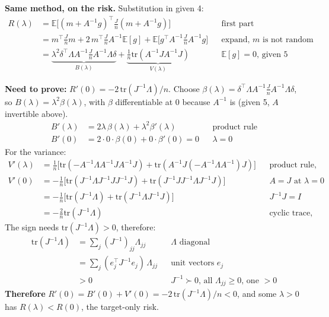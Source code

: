 \documentclass{article}
\begin{document}
\textbf{Same method, on the risk.} Substitution in given 4:
\begin{align*}
R(\lambda) &= \mathbb{E}\bigl[(m + A^{-1}g)^\top \tfrac{J}{n} (m + A^{-1}g)\bigr] && \text{first part}\\
&= m^\top \tfrac{J}{n} m + 2\, m^\top \tfrac{J}{n} A^{-1}\mathbb{E}[g] + \mathbb{E}\bigl[g^\top A^{-1}\tfrac{J}{n}A^{-1} g\bigr] && \text{expand, $m$ is not random}\\
&= \underbrace{\lambda^2 \delta^\top\Lambda A^{-1}\tfrac{J}{n}A^{-1}\Lambda\delta}_{B(\lambda)} + \underbrace{\tfrac{1}{n}\mathrm{tr}(A^{-1}JA^{-1}J)}_{V(\lambda)} && \text{$\mathbb{E}[g] = 0$, given 5}
\end{align*}

\textbf{Need to prove:} $R'(0) = -2\,\mathrm{tr}(J^{-1}\Lambda)/n$.
Choose $\beta(\lambda) = \delta^\top\Lambda A^{-1}\tfrac{J}{n}A^{-1}\Lambda\delta$, so $B(\lambda) = \lambda^2\beta(\lambda)$, with $\beta$ differentiable at $0$ because $A^{-1}$ is (given 5, $A$ invertible above).
\begin{align*}
B'(\lambda) &= 2\lambda\,\beta(\lambda) + \lambda^2\beta'(\lambda) && \text{product rule}\\
B'(0) &= 2\cdot 0\cdot\beta(0) + 0\cdot\beta'(0) = 0 && \text{$\lambda = 0$}
\end{align*}
For the variance:
\begin{align*}
V'(\lambda) &= \tfrac{1}{n}\bigl[\mathrm{tr}(-A^{-1}\Lambda A^{-1} J A^{-1} J) + \mathrm{tr}(A^{-1} J (-A^{-1}\Lambda A^{-1}) J)\bigr] && \text{product rule, given 5}\\
V'(0) &= -\tfrac{1}{n}\bigl[\mathrm{tr}(J^{-1}\Lambda J^{-1}J J^{-1}J) + \mathrm{tr}(J^{-1}J J^{-1}\Lambda J^{-1}J)\bigr] && \text{$A = J$ at $\lambda = 0$}\\
&= -\tfrac{1}{n}\bigl[\mathrm{tr}(J^{-1}\Lambda) + \mathrm{tr}(J^{-1}\Lambda J^{-1}J)\bigr] && \text{$J^{-1}J = I$}\\
&= -\tfrac{2}{n}\mathrm{tr}(J^{-1}\Lambda) && \text{cyclic trace, given 5}
\end{align*}
The sign needs $\mathrm{tr}(J^{-1}\Lambda) > 0$, therefore:
\begin{align*}
\mathrm{tr}(J^{-1}\Lambda) &= \textstyle\sum_j (J^{-1})_{jj}\Lambda_{jj} && \text{$\Lambda$ diagonal}\\
&= \textstyle\sum_j (e_j^\top J^{-1} e_j)\,\Lambda_{jj} && \text{unit vectors $e_j$}\\
&> 0 && \text{$J^{-1} \succ 0$, all $\Lambda_{jj} \ge 0$, one $> 0$}
\end{align*}
\textbf{Therefore} $R'(0) = B'(0) + V'(0) = -2\,\mathrm{tr}(J^{-1}\Lambda)/n < 0$, and some $\lambda > 0$ has $R(\lambda) < R(0)$, the target-only risk.
\end{document}
